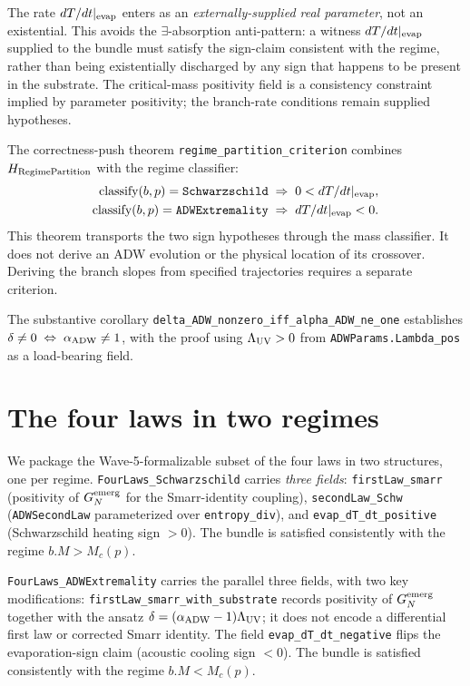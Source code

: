 \documentclass[prd,aps,twocolumn,floatfix,nofootinbib,superscriptaddress]{revtex4-2}
\newcommand{\Mc}{M_{c}}
\newcommand{\GN}{G_{N}^{\rm emerg}}
\newcommand{\aADW}{\alpha_{\rm ADW}}
\newcommand{\Ladw}{\Lambda_{\rm UV}}
\begin{document}
The rate $dT/dt|_{\rm evap}$ enters as an
\emph{externally-supplied real parameter}, not an existential.
This avoids the $\exists$-absorption anti-pattern: a witness
$dT/dt|_{\rm evap}$ supplied to the bundle must satisfy the
sign-claim consistent with the regime, rather than being existentially
discharged by any sign that happens to be present in the substrate.
The critical-mass positivity field is a consistency constraint implied
by parameter positivity; the branch-rate conditions remain supplied hypotheses.

The correctness-push theorem
\texttt{regime\_partition\_criterion} combines $H_{\rm RegimePartition}$
with the regime classifier:
\begin{align}
\text{classify}(b,p) = \texttt{Schwarzschild} &\;\Rightarrow\;
0 < dT/dt|_{\rm evap}, \nonumber \\
\text{classify}(b,p) = \texttt{ADWExtremality} &\;\Rightarrow\;
dT/dt|_{\rm evap} < 0.
\label{eq:regime-partition}
\end{align}
This theorem transports the two sign hypotheses through the mass
classifier. It does not derive an ADW evolution or the physical
location of its crossover. Deriving the branch slopes from specified
trajectories requires a separate criterion.

The substantive corollary
\texttt{delta\_ADW\_nonzero\_iff\_alpha\_ADW\_ne\_one} establishes
$\delta \neq 0 \;\Leftrightarrow\; \aADW \neq 1$, with the proof using
$\Ladw > 0$ from \texttt{ADWParams.Lambda\_pos} as a load-bearing field.

\section{The four laws in two regimes}
\label{sec:fourlaws}

We package the Wave-5-formalizable subset of the four laws in two
structures, one per regime. \texttt{FourLaws\_Schwarzschild} carries
\emph{three fields}: \texttt{firstLaw\_smarr}
(positivity of $\GN$ for the Smarr-identity coupling),
\texttt{secondLaw\_Schw} (\texttt{ADWSecondLaw} parameterized over
\texttt{entropy\_div}), and \texttt{evap\_dT\_dt\_positive}
(Schwarzschild heating sign $> 0$). The bundle is satisfied
consistently with the regime $b.M > \Mc(p)$.

\texttt{FourLaws\_ADWExtremality} carries the parallel three
fields, with two key modifications:
\texttt{firstLaw\_smarr\_with\_substrate} records positivity of
$\GN$ together with the ansatz $\delta = (\aADW - 1)\Ladw$; it does
not encode a differential first law or corrected Smarr identity.
The field
\texttt{evap\_dT\_dt\_negative} flips the evaporation-sign claim
(acoustic cooling sign $< 0$). The bundle is satisfied
consistently with the regime $b.M < \Mc(p)$.
\end{document}

